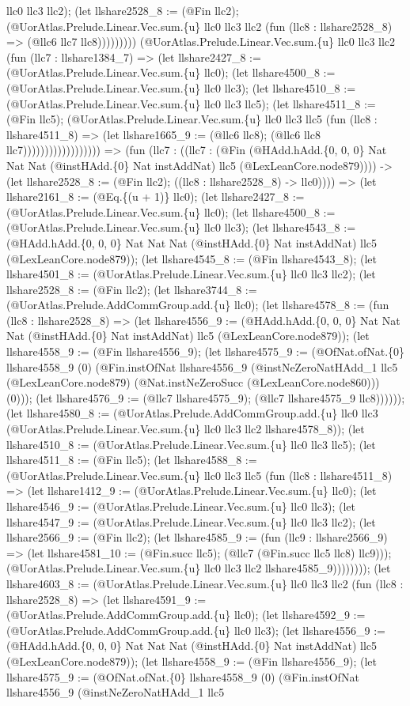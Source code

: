 \documentclass[11pt]{article}
\begin{document}
llc0 llc3 llc2); (let llshare2528\_8 := (@Fin llc2); (@UorAtlas.Prelude.Linear.Vec.sum.\{u\} llc0 llc3 llc2 (fun (llc8 : llshare2528\_8) => (@llc6 llc7 llc8))))))))) (@UorAtlas.Prelude.Linear.Vec.sum.\{u\} llc0 llc3 llc2 (fun (llc7 : llshare1384\_7) => (let llshare2427\_8 := (@UorAtlas.Prelude.Linear.Vec.sum.\{u\} llc0); (let llshare4500\_8 := (@UorAtlas.Prelude.Linear.Vec.sum.\{u\} llc0 llc3); (let llshare4510\_8 := (@UorAtlas.Prelude.Linear.Vec.sum.\{u\} llc0 llc3 llc5); (let llshare4511\_8 := (@Fin llc5); (@UorAtlas.Prelude.Linear.Vec.sum.\{u\} llc0 llc3 llc5 (fun (llc8 : llshare4511\_8) => (let llshare1665\_9 := (@llc6 llc8); (@llc6 llc8 llc7)))))))))))))))))) => (fun (llc7 : ((llc7 : (@Fin (@HAdd.hAdd.\{0, 0, 0\} Nat Nat Nat (@instHAdd.\{0\} Nat instAddNat) llc5 (@LexLeanCore.node879)))) -> (let llshare2528\_8 := (@Fin llc2); ((llc8 : llshare2528\_8) -> llc0)))) => (let llshare2161\_8 := (@Eq.\{(u + 1)\} llc0); (let llshare2427\_8 := (@UorAtlas.Prelude.Linear.Vec.sum.\{u\} llc0); (let llshare4500\_8 := (@UorAtlas.Prelude.Linear.Vec.sum.\{u\} llc0 llc3); (let llshare4543\_8 := (@HAdd.hAdd.\{0, 0, 0\} Nat Nat Nat (@instHAdd.\{0\} Nat instAddNat) llc5 (@LexLeanCore.node879)); (let llshare4545\_8 := (@Fin llshare4543\_8); (let llshare4501\_8 := (@UorAtlas.Prelude.Linear.Vec.sum.\{u\} llc0 llc3 llc2); (let llshare2528\_8 := (@Fin llc2); (let llshare3744\_8 := (@UorAtlas.Prelude.AddCommGroup.add.\{u\} llc0); (let llshare4578\_8 := (fun (llc8 : llshare2528\_8) => (let llshare4556\_9 := (@HAdd.hAdd.\{0, 0, 0\} Nat Nat Nat (@instHAdd.\{0\} Nat instAddNat) llc5 (@LexLeanCore.node879)); (let llshare4558\_9 := (@Fin llshare4556\_9); (let llshare4575\_9 := (@OfNat.ofNat.\{0\} llshare4558\_9 (0) (@Fin.instOfNat llshare4556\_9 (@instNeZeroNatHAdd\_1 llc5 (@LexLeanCore.node879) (@Nat.instNeZeroSucc (@LexLeanCore.node860))) (0))); (let llshare4576\_9 := (@llc7 llshare4575\_9); (@llc7 llshare4575\_9 llc8)))))); (let llshare4580\_8 := (@UorAtlas.Prelude.AddCommGroup.add.\{u\} llc0 llc3 (@UorAtlas.Prelude.Linear.Vec.sum.\{u\} llc0 llc3 llc2 llshare4578\_8)); (let llshare4510\_8 := (@UorAtlas.Prelude.Linear.Vec.sum.\{u\} llc0 llc3 llc5); (let llshare4511\_8 := (@Fin llc5); (let llshare4588\_8 := (@UorAtlas.Prelude.Linear.Vec.sum.\{u\} llc0 llc3 llc5 (fun (llc8 : llshare4511\_8) => (let llshare1412\_9 := (@UorAtlas.Prelude.Linear.Vec.sum.\{u\} llc0); (let llshare4546\_9 := (@UorAtlas.Prelude.Linear.Vec.sum.\{u\} llc0 llc3); (let llshare4547\_9 := (@UorAtlas.Prelude.Linear.Vec.sum.\{u\} llc0 llc3 llc2); (let llshare2566\_9 := (@Fin llc2); (let llshare4585\_9 := (fun (llc9 : llshare2566\_9) => (let llshare4581\_10 := (@Fin.succ llc5); (@llc7 (@Fin.succ llc5 llc8) llc9))); (@UorAtlas.Prelude.Linear.Vec.sum.\{u\} llc0 llc3 llc2 llshare4585\_9)))))))); (let llshare4603\_8 := (@UorAtlas.Prelude.Linear.Vec.sum.\{u\} llc0 llc3 llc2 (fun (llc8 : llshare2528\_8) => (let llshare4591\_9 := (@UorAtlas.Prelude.AddCommGroup.add.\{u\} llc0); (let llshare4592\_9 := (@UorAtlas.Prelude.AddCommGroup.add.\{u\} llc0 llc3); (let llshare4556\_9 := (@HAdd.hAdd.\{0, 0, 0\} Nat Nat Nat (@instHAdd.\{0\} Nat instAddNat) llc5 (@LexLeanCore.node879)); (let llshare4558\_9 := (@Fin llshare4556\_9); (let llshare4575\_9 := (@OfNat.ofNat.\{0\} llshare4558\_9 (0) (@Fin.instOfNat llshare4556\_9 (@instNeZeroNatHAdd\_1 llc5 
\end{document}
